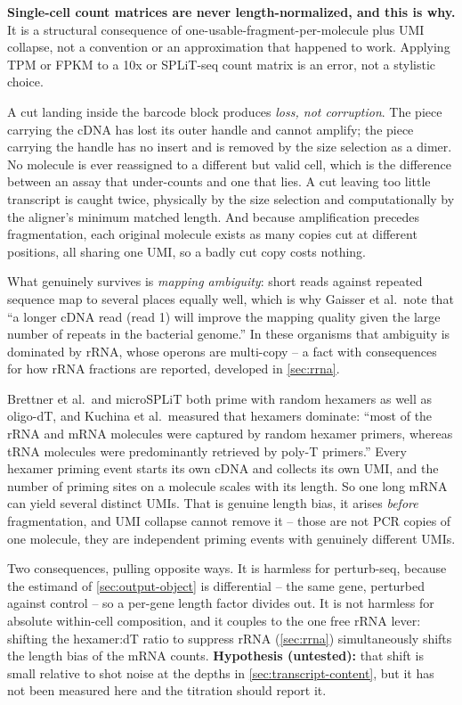 \begin{keybox}
\textbf{Single-cell count matrices are never length-normalized, and this is why.}
It is a structural consequence of one-usable-fragment-per-molecule plus UMI
collapse, not a convention or an approximation that happened to work. Applying
TPM or FPKM to a 10x or SPLiT-seq count matrix is an error, not a stylistic
choice.
\end{keybox}

 A cut landing inside the
barcode block produces \emph{loss, not corruption}. The piece carrying the cDNA
has lost its outer handle and cannot amplify; the piece carrying the handle has
no insert and is removed by the size selection as a dimer. No molecule is ever
reassigned to a different but valid cell, which is the difference between an
assay that under-counts and one that lies. A cut leaving too little transcript
is caught twice, physically by the size selection and computationally by the
aligner's minimum matched length. And because amplification precedes
fragmentation, each original molecule exists as many copies cut at different
positions, all sharing one UMI, so a badly cut copy costs nothing.

What genuinely survives is \emph{mapping ambiguity}: short reads against
repeated sequence map to several places equally well, which is why Gaisser et
al.\ note that ``a longer cDNA read (read 1) will improve the mapping quality
given the large number of repeats in the bacterial genome.'' In these organisms
that ambiguity is dominated by rRNA, whose operons are multi-copy -- a fact with
consequences for how rRNA fractions are reported, developed in \cref{sec:rrna}.

 Brettner et
al.\ and microSPLiT both prime with random hexamers as well as oligo-dT, and
Kuchina et al.\ measured that hexamers dominate: ``most of the rRNA and mRNA
molecules were captured by random hexamer primers, whereas tRNA molecules were
predominantly retrieved by poly-T primers.'' Every hexamer priming event starts
its own cDNA and collects its own UMI, and the number of priming sites on a
molecule scales with its length. So one long mRNA can yield several distinct
UMIs. That is genuine length bias, it arises \emph{before} fragmentation, and
UMI collapse cannot remove it -- those are not PCR copies of one molecule, they
are independent priming events with genuinely different UMIs.

Two consequences, pulling opposite ways. It is harmless for perturb-seq, because
the estimand of \cref{sec:output-object} is differential -- the same gene,
perturbed against control -- so a per-gene length factor divides out. It is not
harmless for absolute within-cell composition, and it couples to the one free
rRNA lever: shifting the hexamer:dT ratio to suppress rRNA (\cref{sec:rrna})
simultaneously shifts the length bias of the mRNA counts. \textbf{Hypothesis
(untested):} that shift is small relative to shot noise at the depths in
\cref{sec:transcript-content}, but it has not been measured here and the
titration should report it.

